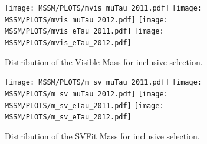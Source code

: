 \begin{figure}[htbp]
  \begin{center}
    \texttt{[image: MSSM/PLOTS/mvis\_muTau\_2011.pdf]}
    \texttt{[image: MSSM/PLOTS/mvis\_muTau\_2012.pdf]}
    \texttt{[image: MSSM/PLOTS/mvis\_eTau\_2011.pdf]}
    \texttt{[image: MSSM/PLOTS/mvis\_eTau\_2012.pdf]}
    \caption{
      Distribution of the Visible Mass for inclusive selection.
    }
    \label{figure:mVis}
  \end{center}
\end{figure}


\begin{figure}[htbp]
  \begin{center}
    \texttt{[image: MSSM/PLOTS/m\_sv\_muTau\_2011.pdf]}
    \texttt{[image: MSSM/PLOTS/m\_sv\_muTau\_2012.pdf]}
    \texttt{[image: MSSM/PLOTS/m\_sv\_eTau\_2011.pdf]}
    \texttt{[image: MSSM/PLOTS/m\_sv\_eTau\_2012.pdf]}
    \caption{
      Distribution of the SVFit Mass for inclusive selection.
    }
    \label{figure:svFit}
  \end{center}
\end{figure}

